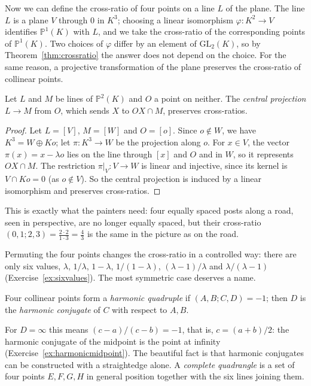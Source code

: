 Now we can define the cross-ratio of four points on a line $L$ of the plane. The line $L$ is a plane $V$ through $0$ in $K^3$; choosing a linear
isomorphism $\varphi:K^2\to V$ identifies $\mathbb P^1(K)$ with $L$, and we take the cross-ratio of the corresponding points of $\mathbb P^1(K)$.
Two choices of $\varphi$ differ by an element of $\mathrm{GL}_2(K)$, so by Theorem~\ref{thm:crossratio} the answer does not depend on the
choice. For the same reason, a projective transformation of the plane preserves the cross-ratio of collinear points.

\begin{proposition}\label{prop:perspectivity}
Let $L$ and $M$ be lines of $\mathbb P^2(K)$ and $O$ a point on neither. The \emph{central projection} $L\to M$ from $O$, which sends $X$ to
$OX\cap M$, preserves cross-ratios.
\end{proposition}

\begin{proof}
Let $L=[V]$, $M=[W]$ and $O=[o]$. Since $o\notin W$, we have $K^3=W\oplus Ko$; let $\pi:K^3\to W$ be the projection along $o$. For $x\in V$, the
vector $\pi(x)=x-\lambda o$ lies on the line through $[x]$ and $O$ and in $W$, so it represents $OX\cap M$. The restriction $\pi|_V:V\to W$ is linear
and injective, since its kernel is $V\cap Ko=0$ (as $o\notin V$). So the central projection is induced by a linear isomorphism and preserves
cross-ratios.
\end{proof}

This is exactly what the painters need: four equally spaced posts along a road, seen in perspective, are no longer equally spaced, but their
cross-ratio $(0,1;2,3)=\frac{2\cdot2}{1\cdot3}=\frac43$ is the same in the picture as on the road.

Permuting the four points changes the cross-ratio in a controlled way: there are only six values, $\lambda$, $1/\lambda$, $1-\lambda$,
$1/(1-\lambda)$, $(\lambda-1)/\lambda$ and $\lambda/(\lambda-1)$ (Exercise~\ref{ex:sixvalues}). The most symmetric case deserves a name.

\begin{definition}
Four collinear points form a \emph{harmonic quadruple} if $(A,B;C,D)=-1$; then $D$ is the \emph{harmonic conjugate} of $C$ with respect to $A,B$.
\end{definition}

For $D=\infty$ this means $(c-a)/(c-b)=-1$, that is, $c=(a+b)/2$: the harmonic conjugate of the midpoint is the point at infinity
(Exercise~\ref{ex:harmonicmidpoint}). The beautiful fact is that harmonic conjugates can be constructed with a straightedge alone. A
\emph{complete quadrangle} is a set of four points $E,F,G,H$ in general position together with the six lines joining them.

